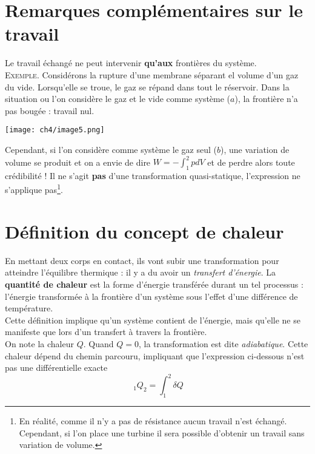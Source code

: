 \setcounter{section}{3}
\section{Remarques complémentaires sur le travail}
Le travail échangé ne peut intervenir \textbf{qu'aux} frontières 
du système.\\
\textsc{Exemple.} Considérons la rupture d'une membrane séparant 
el volume d'un gaz du vide. Lorsqu'elle se troue, le gaz se 
répand dans tout le réservoir. Dans la situation ou l'on considère 
le gaz et le vide comme système ($a$), la frontière n'a pas bougée : 
travail nul. 
\begin{center}
	\texttt{[image: ch4/image5.png]}
\end{center}

Cependant, si l'on considère comme système le gaz seul ($b$),  une variation 
de volume se produit et on a envie de dire $W = -\int_1^2 pdV$ et 
de perdre alors toute crédibilité ! Il ne s'agit \textbf{pas} d'une 
transformation quasi-statique, l'expression ne s'applique pas\footnote{
	En réalité, comme il n'y a pas de résistance aucun travail n'est 
	échangé. Cependant, si l'on place une turbine il sera possible d'obtenir 
un travail sans variation de volume.}.


\section{Définition du concept de chaleur}
En mettant deux corps en contact, ils vont subir une transformation 
pour atteindre l'équilibre thermique : il y a du avoir un \textit{
	transfert d'énergie}. La \textbf{quantité de chaleur} est la forme 
d'énergie transférée durant un tel processus : l'énergie transformée
à la frontière d'un système sous l'effet d'une différence de 
température.\\

Cette définition implique qu'un système contient de l'énergie, mais 
qu'elle ne se manifeste que lors d'un transfert à travers la frontière.\\
On note la chaleur $Q$. Quand $Q=0$, la transformation est dite 
\textit{adiabatique}. Cette chaleur dépend du chemin parcouru, impliquant 
que l'expression ci-dessous n'est pas une différentielle exacte
\begin{equation}
	\ _1Q_2 = \int_1^2 \delta Q
\end{equation}


